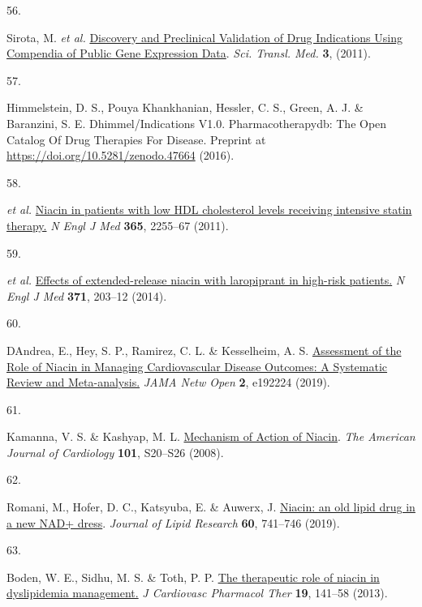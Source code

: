 \documentclass[
  a4paper,
]{article}
\newlength{\cslhangindent}
\newlength{\csllabelwidth}
\newlength{\cslentryspacingunit} %
\newenvironment{CSLReferences}[2] %
 {%
  \setlength{\parindent}{0pt}
  \ifodd #1
  \let\oldpar\par
  \def\par{\hangindent=\cslhangindent\oldpar}
  \fi
  \setlength{\parskip}{#2\cslentryspacingunit}
 }%
 {}
\newcommand{\CSLLeftMargin}[1]{\parbox[t]{\csllabelwidth}{#1}}
\newcommand{\CSLRightInline}[1]{\parbox[t]{\linewidth - \csllabelwidth}{#1}\break}
\begin{document}
\begin{CSLReferences}{0}{0}
\leavevmode{}%
\CSLLeftMargin{56. }%
\CSLRightInline{Sirota, M. \emph{et al.} \href{https://doi.org/10.1126/scitranslmed.3001318}{Discovery and Preclinical Validation of Drug Indications Using Compendia of Public Gene Expression Data}. \emph{Sci. Transl. Med.} \textbf{3}, (2011).}

\leavevmode{}%
\CSLLeftMargin{57. }%
\CSLRightInline{Himmelstein, D. S., Pouya Khankhanian, Hessler, C. S., Green, A. J. \& Baranzini, S. E. Dhimmel/Indications V1.0. Pharmacotherapydb: The Open Catalog Of Drug Therapies For Disease. Preprint at \url{https://doi.org/10.5281/zenodo.47664} (2016).}

\leavevmode{}%
\CSLLeftMargin{58. }%
\CSLRightInline{\emph{et al.} \href{https://doi.org/10.1056/nejmoa1107579}{Niacin in patients with low HDL cholesterol levels receiving intensive statin therapy.} \emph{N Engl J Med} \textbf{365}, 2255--67 (2011).}

\leavevmode{}%
\CSLLeftMargin{59. }%
\CSLRightInline{\emph{et al.} \href{https://doi.org/10.1056/nejmoa1300955}{Effects of extended-release niacin with laropiprant in high-risk patients.} \emph{N Engl J Med} \textbf{371}, 203--12 (2014).}

\leavevmode{}%
\CSLLeftMargin{60. }%
\CSLRightInline{D\textquotesingle Andrea, E., Hey, S. P., Ramirez, C. L. \& Kesselheim, A. S. \href{https://doi.org/10.1001/jamanetworkopen.2019.2224}{Assessment of the Role of Niacin in Managing Cardiovascular Disease Outcomes: A Systematic Review and Meta-analysis.} \emph{JAMA Netw Open} \textbf{2}, e192224 (2019).}

\leavevmode{}%
\CSLLeftMargin{61. }%
\CSLRightInline{Kamanna, V. S. \& Kashyap, M. L. \href{https://doi.org/10.1016/j.amjcard.2008.02.029}{Mechanism of Action of Niacin}. \emph{The American Journal of Cardiology} \textbf{101}, S20--S26 (2008).}

\leavevmode{}%
\CSLLeftMargin{62. }%
\CSLRightInline{Romani, M., Hofer, D. C., Katsyuba, E. \& Auwerx, J. \href{https://doi.org/10.1194/jlr.s092007}{Niacin: an old lipid drug in a new NAD+ dress}. \emph{Journal of Lipid Research} \textbf{60}, 741--746 (2019).}

\leavevmode{}%
\CSLLeftMargin{63. }%
\CSLRightInline{Boden, W. E., Sidhu, M. S. \& Toth, P. P. \href{https://doi.org/10.1177/1074248413514481}{The therapeutic role of niacin in dyslipidemia management.} \emph{J Cardiovasc Pharmacol Ther} \textbf{19}, 141--58 (2013).}


\end{CSLReferences}
\end{document}
